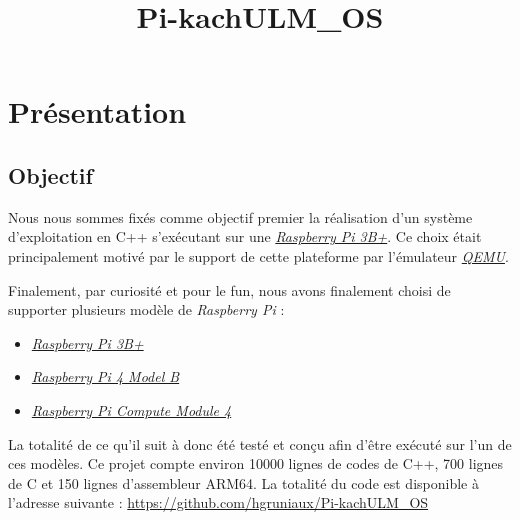 \documentclass[french, 12pt]{article}
\title{Pi-kachULM\_OS}
\author{}
\date{}
\newcommand{\rpi}{\emph{Raspberry Pi}}
\begin{document}
\maketitle

\section{Présentation}
\subsection{Objectif}
Nous nous sommes fixés comme objectif premier la réalisation d'un système
d'exploitation en C++ s'exécutant sur une
\href{https://www.raspberrypi.com/products/raspberry-pi-3-model-b-plus/}{\emph{Raspberry Pi 3B+}}.
Ce choix était principalement motivé par le support de cette plateforme par
l'émulateur \href{https://www.qemu.org/}{\emph{QEMU}}.

Finalement, par curiosité et pour le fun\texttrademark, nous avons finalement
choisi de supporter plusieurs modèle de \rpi{} :
\begin{itemize}
    \item \href{https://www.raspberrypi.com/products/raspberry-pi-3-model-b-plus/}{\emph{Raspberry Pi 3B+}}
    \item \href{https://www.raspberrypi.com/products/raspberry-pi-4-model-b/}{\emph{Raspberry Pi 4 Model B}}
    \item \href{https://www.raspberrypi.com/products/compute-module-4/?variant=raspberry-pi-cm4001000}{\emph{Raspberry Pi Compute Module 4}}
\end{itemize}

La totalité de ce qu'il suit à donc été testé et conçu afin d'être exécuté sur
l'un de ces modèles. Ce projet compte environ \num{10000} lignes de codes de
C++, \num{700} lignes de C et \num{150} lignes d'assembleur ARM64. La totalité du code
est disponible à l'adresse suivante : \url{https://github.com/hgruniaux/Pi-kachULM_OS}


\end{document}
